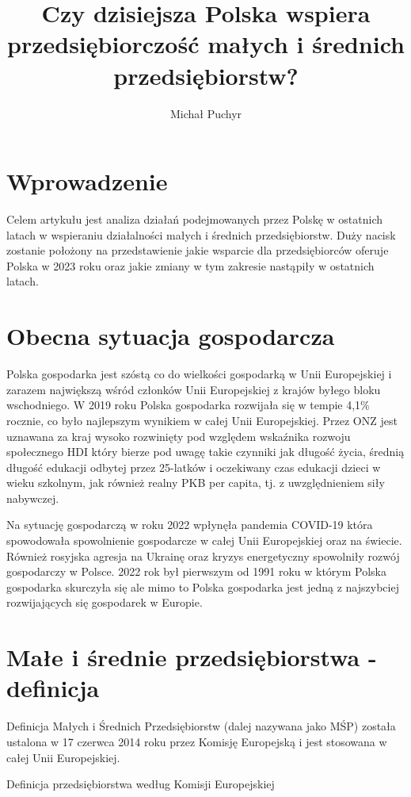 \documentclass[11pt]{article}
\author{Michał Puchyr}
\date{}
\title{\textbf{Czy dzisiejsza Polska wspiera przedsiębiorczość małych i średnich przedsiębiorstw?}}
\begin{document}
\maketitle
\section*{Wprowadzenie}
Celem artykułu jest analiza działań podejmowanych przez Polskę w ostatnich latach w wspieraniu działalności małych i średnich przedsiębiorstw.
Duży nacisk zostanie położony na przedstawienie jakie wsparcie dla przedsiębiorców oferuje Polska w 2023 roku 
oraz jakie zmiany w tym zakresie nastąpiły w ostatnich latach.

\section*{Obecna sytuacja gospodarcza}
Polska gospodarka jest szóstą co do wielkości gospodarką w Unii Europejskiej i zarazem największą wśród członków Unii Europejskiej z krajów byłego bloku wschodniego.
W 2019 roku Polska gospodarka rozwijała się w tempie 4,1\% rocznie, co było najlepszym wynikiem w całej Unii Europejskiej.
Przez ONZ jest uznawana za kraj wysoko rozwinięty pod względem wskaźnika rozwoju społecznego HDI który 
bierze pod uwagę takie czynniki jak długość życia, średnią długość edukacji odbytej
przez 25-latków i oczekiwany czas edukacji dzieci w wieku szkolnym, jak również realny PKB per capita, tj. z uwzględnieniem siły nabywczej.

Na sytuację gospodarczą w roku 2022 wpłynęła pandemia COVID-19 która spowodowała spowolnienie gospodarcze w całej Unii Europejskiej oraz na świecie.
Również rosyjska agresja na Ukrainę oraz kryzys energetyczny spowolniły rozwój gospodarczy w Polsce.
2022 rok był pierwszym od 1991 roku w którym Polska gospodarka skurczyła się ale mimo to Polska gospodarka jest jedną z najszybciej rozwijających się gospodarek w Europie.


\section*{Małe i średnie przedsiębiorstwa - definicja}
Definicja Małych i Średnich Przedsiębiorstw (dalej nazywana jako MŚP) została ustalona w 17 czerwca 2014 roku przez Komisję Europejską i jest stosowana w całej Unii Europejskiej.

Definicja przedsiębiorstwa według Komisji Europejskiej \cite{Komisja}
\end{document}
